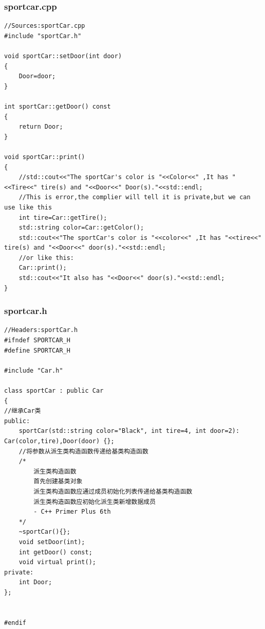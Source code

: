 \documentclass[UTF8,18pt]{ctexart}
\begin{document}
\subsubsection{sportcar.cpp}
\begin{verbatim}
//Sources:sportCar.cpp
#include "sportCar.h"

void sportCar::setDoor(int door)
{
    Door=door;
}

int sportCar::getDoor() const
{
    return Door;
}

void sportCar::print()
{
    //std::cout<<"The sportCar's color is "<<Color<<" ,It has "<<Tire<<" tire(s) and "<<Door<<" Door(s)."<<std::endl;
    //This is error,the complier will tell it is private,but we can use like this
    int tire=Car::getTire();
    std::string color=Car::getColor();
    std::cout<<"The sportCar's color is "<<color<<" ,It has "<<tire<<" tire(s) and "<<Door<<" door(s)."<<std::endl;
    //or like this:
    Car::print();
    std::cout<<"It also has "<<Door<<" door(s)."<<std::endl;
}

\end{verbatim}
\subsubsection{sportcar.h}
\begin{verbatim}
//Headers:sportCar.h
#ifndef SPORTCAR_H
#define SPORTCAR_H

#include "Car.h"

class sportCar : public Car
{
//继承Car类
public:
	sportCar(std::string color="Black", int tire=4, int door=2): Car(color,tire),Door(door) {};
	//将参数从派生类构造函数传递给基类构造函数
    /*
        派生类构造函数
        首先创建基类对象
        派生类构造函数应通过成员初始化列表传递给基类构造函数
        派生类构造函数应初始化派生类新增数据成员
        - C++ Primer Plus 6th
    */
	~sportCar(){};
	void setDoor(int);
	int getDoor() const;
	void virtual print();
private:
	int Door;
};


#endif

\end{verbatim}
\end{document}
